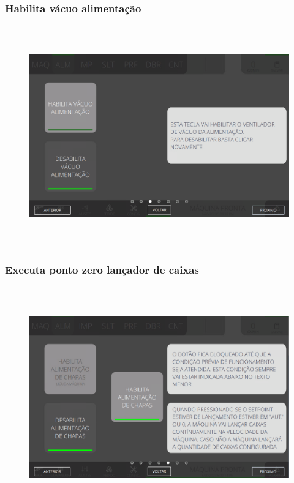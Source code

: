 \newpage
\thispagestyle{fancy}
\vspace*{40 pt}
\subsubsection{\small{Habilita vácuo alimentação}}\label{miniTelaComandoAlimentacaoHabilitaVacioAlimentacao}
\vspace*{\fill}
\begin{figure}[h]
  \centering
  \includegraphics[width=576px,height=360px]{src/imagesMiniline/03-Feeder/commands/e3.png}
\end{figure}
\vspace*{\fill}

\newpage
\thispagestyle{fancy}
\vspace*{40 pt}
\subsubsection{\small{Executa ponto zero lançador de caixas}}\label{miniTelaComandoAlimentacaoExecutaPontoZeroLancadorDeCaixas}
\vspace*{\fill}
\begin{figure}[h]
  \centering
  \includegraphics[width=576px,height=360px]{src/imagesMiniline/03-Feeder/commands/e4.png}
\end{figure}
\vspace*{\fill}

